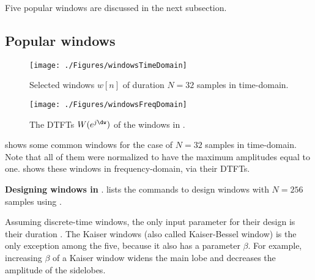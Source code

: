 Five popular windows are discussed in the next subsection.

\subsection{Popular windows}


\begin{figure}[htbp]
\centering
\texttt{[image: ./Figures/windowsTimeDomain]}
\caption{Selected windows $w[n]$ of duration $N=32$ samples in time-domain.\label{fig:windowsTimeDomain}}
\end{figure}

\begin{figure}[htbp]
\centering
\texttt{[image: ./Figures/windowsFreqDomain]}
\caption{The DTFTs $W(e^{j \dw})$ of the windows in .\label{fig:windowsFreqDomain}}
\end{figure}

 shows some common windows for the case of $N=32$ samples in time-domain. Note that all of them were normalized to have the maximum amplitudes equal to one.  shows these windows in frequency-domain, via their DTFTs.

\bExample \textbf{Designing windows in {\matlab}}.
 lists the commands to design windows with $N=256$ samples
using {\matlab}.


Assuming discrete-time windows, the only input parameter for their design is their duration . 
The Kaiser windows (also called Kaiser-Bessel window) is the only exception among the five, because it also has a parameter $\beta$. For example, increasing $\beta$ of a Kaiser window widens the main lobe and decreases the amplitude of the sidelobes.
\eExample

